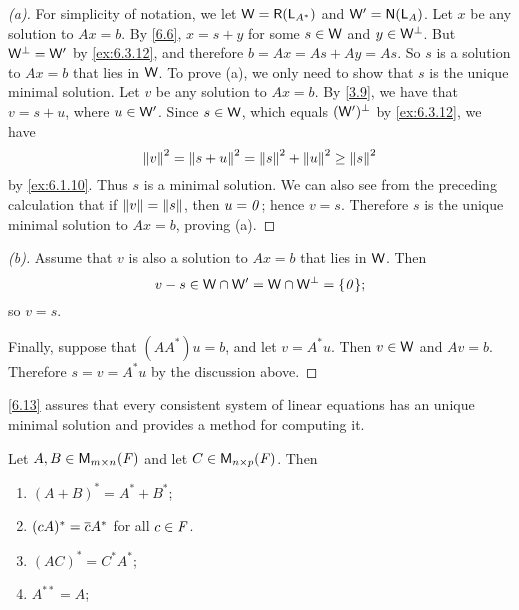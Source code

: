 \begin{proof}[(a)]
  For simplicity of notation, we let \(\W = \rg{\L_{A^*}}\) and \(\W' = \ns{\L_A}\).
  Let \(x\) be any solution to \(Ax = b\).
  By \cref{6.6}, \(x = s + y\) for some \(s \in \mathsf{W}\) and \(y \in \mathsf{W}^{\perp}\).
  But \(\mathsf{W}^{\perp} = \mathsf{W}'\) by \cref{ex:6.3.12}, and therefore \(b = Ax = As + Ay = As\).
  So \(s\) is a solution to \(Ax = b\) that lies in \(\mathsf{W}\).
  To prove (a), we only need to show that \(s\) is the unique minimal solution.
  Let \(v\) be any solution to \(Ax = b\).
  By \cref{3.9}, we have that \(v = s + u\), where \(u \in \mathsf{W}'\).
  Since \(s \in \mathsf{W}\), which equals \((\mathsf{W}')^{\perp}\) by \cref{ex:6.3.12}, we have
  \[
    \left\lVert v\right\rVert^2 = \left\lVert s + u\right\rVert^2 = \left\lVert s\right\rVert^2 + \left\lVert u\right\rVert^2 \geq \left\lVert s\right\rVert^2
  \]
  by \cref{ex:6.1.10}.
  Thus \(s\) is a minimal solution.
  We can also see from the preceding calculation that if \(\left\lVert v\right\rVert = \left\lVert s\right\rVert\), then \(u = \mathit{0}\);
  hence \(v = s\).
  Therefore \(s\) is the unique minimal solution to \(Ax = b\), proving (a).
\end{proof}

\begin{proof}[(b)]
  Assume that \(v\) is also a solution to \(Ax = b\) that lies in \(\mathsf{W}\).
  Then
  \[
    v - s \in \W \cap \W' = \W \cap \W^{\perp} = \set{\zv};
  \]
  so \(v = s\).

  Finally, suppose that \((A A^*) u = b\), and let \(v = A^* u\).
  Then \(v \in \mathsf{W}\) and \(Av = b\).
  Therefore \(s = v = A^* u\) by the discussion above.
\end{proof}

\begin{note}
  \cref{6.13} assures that every consistent system of linear equations has an unique minimal solution and provides a method for computing it.
\end{note}

\exercisesection

\setcounter{ex}{4}
\begin{ex}\label{ex:6.3.5}
  Let \(A, B \in \ms\) and let \(C \in \ms[n][p][\F]\).
  Then
  \begin{enumerate}
    \item \((A + B)^* = A^* + B^*\);
    \item \((cA)^* = \overline{c} A^*\) for all \(c \in \mathit{F}\).
    \item \((AC)^* = C^* A^*\);
    \item \(A^{**} = A\);
  \end{enumerate}
\end{ex}

